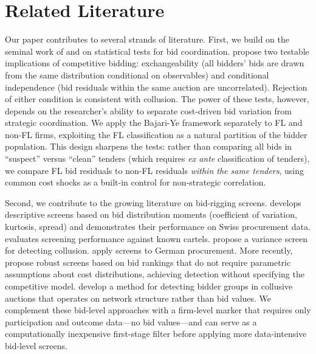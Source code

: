 \section{Related Literature}
\label{sec:literature}

Our paper contributes to several strands of literature. First, we build on the seminal work of \citet{bajari2003deciding} and \citet{porter1993detection} on statistical tests for bid coordination. \citet{bajari2003deciding} propose two testable implications of competitive bidding: exchangeability (all bidders' bids are drawn from the same distribution conditional on observables) and conditional independence (bid residuals within the same auction are uncorrelated). Rejection of either condition is consistent with collusion. The power of these tests, however, depends on the researcher's ability to separate cost-driven bid variation from strategic coordination. We apply the Bajari-Ye framework separately to FL and non-FL firms, exploiting the FL classification as a natural partition of the bidder population. This design sharpens the tests: rather than comparing all bids in ``suspect'' versus ``clean'' tenders (which requires \textit{ex ante} classification of tenders), we compare FL bid residuals to non-FL residuals \textit{within the same tenders}, using common cost shocks as a built-in control for non-strategic correlation.

Second, we contribute to the growing literature on bid-rigging screens. \citet{imhof2019detecting} develops descriptive screens based on bid distribution moments (coefficient of variation, kurtosis, spread) and demonstrates their performance on Swiss procurement data. \citet{imhof2018screening} evaluates screening performance against known cartels. \citet{abrantesmetz2006a} propose a variance screen for detecting collusion. \citet{hüschelrath2014cartel} apply screens to German procurement. More recently, \citet{chassang2022robust} propose robust screens based on bid rankings that do not require parametric assumptions about cost distributions, achieving detection without specifying the competitive model. \citet{conley2016detecting} develop a method for detecting bidder groups in collusive auctions that operates on network structure rather than bid values. We complement these bid-level approaches with a firm-level marker that requires only participation and outcome data---no bid values---and can serve as a computationally inexpensive first-stage filter before applying more data-intensive bid-level screens.

